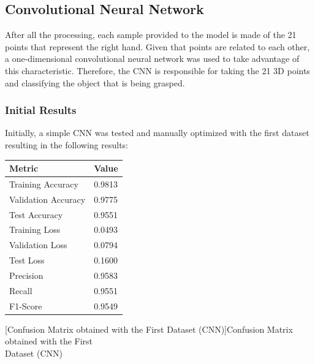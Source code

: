 \subsection{Convolutional Neural Network}

After all the processing, each sample provided to the model is made of the 21 points that represent the right hand. Given that points are related to each other, a one-dimensional convolutional neural network was used to take advantage of this characteristic. Therefore, the CNN is responsible for taking the 21 3D points and classifying the object that is being grasped.

\subsubsection{Initial Results}

Initially, a simple CNN was tested and manually optimized with the first dataset resulting in the following results:

\begin{minipage}{0.35\textwidth}
    \centering
    \captionsetup{justification=centering}
    \label{table:cnn_dataset1_results}
    \begin{tabular}{ |l|l| }
    \hline
    Metric & Value \\
    \hline
    Training Accuracy & 0.9813 \\
    \hline
    Validation Accuracy & 0.9775 \\
    \hline
    Test Accuracy & 0.9551 \\
    \hline
    Training Loss & 0.0493 \\
    \hline
    Validation Loss & 0.0794 \\
    \hline
    Test Loss & 0.1600 \\
    \hline
    Precision & 0.9583 \\
    \hline
    Recall & 0.9551 \\
    \hline
    F1-Score & 0.9549 \\
    \hline
    \end{tabular}
\end{minipage}%
\begin{minipage}{0.65\textwidth}
    \centering
    \captionsetup{justification=centering}
    
    [Confusion Matrix obtained with the First Dataset (CNN)]{Confusion Matrix obtained with the First\\Dataset (CNN)}
    \label{fig:cnn_dataset1_confusion_matrix}
\end{minipage}

